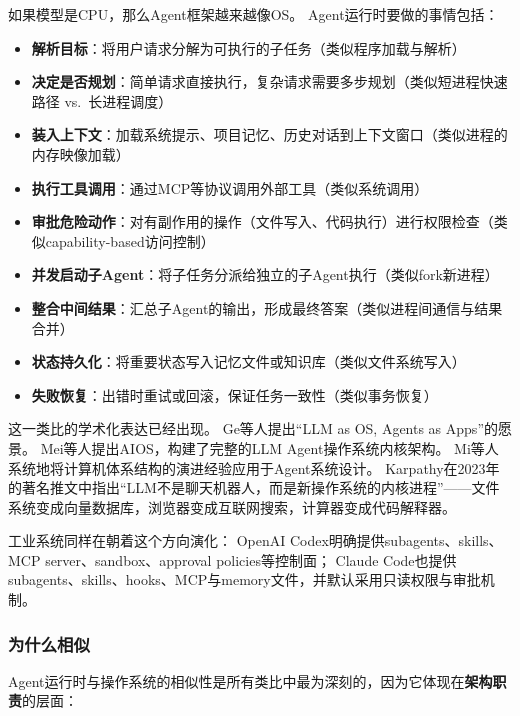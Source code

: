 如果模型是CPU，那么Agent框架越来越像OS。
Agent运行时要做的事情包括：
\begin{itemize}[nosep]
\item \textbf{解析目标}：将用户请求分解为可执行的子任务（类似程序加载与解析）
\item \textbf{决定是否规划}：简单请求直接执行，复杂请求需要多步规划（类似短进程快速路径 vs.\ 长进程调度）
\item \textbf{装入上下文}：加载系统提示、项目记忆、历史对话到上下文窗口（类似进程的内存映像加载）
\item \textbf{执行工具调用}：通过MCP等协议调用外部工具（类似系统调用）
\item \textbf{审批危险动作}：对有副作用的操作（文件写入、代码执行）进行权限检查（类似capability-based访问控制）
\item \textbf{并发启动子Agent}：将子任务分派给独立的子Agent执行（类似fork新进程）
\item \textbf{整合中间结果}：汇总子Agent的输出，形成最终答案（类似进程间通信与结果合并）
\item \textbf{状态持久化}：将重要状态写入记忆文件或知识库（类似文件系统写入）
\item \textbf{失败恢复}：出错时重试或回滚，保证任务一致性（类似事务恢复）
\end{itemize}

这一类比的学术化表达已经出现。
Ge等人提出``LLM as OS, Agents as Apps''的愿景\cite{ge2023llmos}。
Mei等人提出AIOS，构建了完整的LLM Agent操作系统内核架构\cite{mei2024aios}。
Mi等人系统地将计算机体系结构的演进经验应用于Agent系统设计\cite{mi2025llmagentscomputersystems}。
Karpathy在2023年的著名推文中指出``LLM不是聊天机器人，而是新操作系统的内核进程''\cite{karpathy2023llmos}——文件系统变成向量数据库，浏览器变成互联网搜索，计算器变成代码解释器。

工业系统同样在朝着这个方向演化：
OpenAI Codex明确提供subagents、skills、MCP server、sandbox、approval policies等控制面\cite{openai_codex_overview_2026,openai_codex_subagents_2026,openai_codex_skills_2026,openai_codex_security_2026}；
Claude Code也提供subagents、skills、hooks、MCP与memory文件，并默认采用只读权限与审批机制\cite{anthropic_claudecode_subagents_2026,anthropic_claudecode_skills_2026,anthropic_claudecode_security_2026}。

\subsubsection{为什么相似}

Agent运行时与操作系统的相似性是所有类比中最为深刻的，因为它体现在\textbf{架构职责}的层面：

